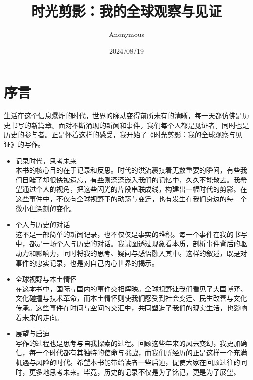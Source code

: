 \documentclass[lang=cn,newtx,10pt,scheme=chinese]{elegantbook}
\title{时光剪影：我的全球观察与见证}
\author{Anonymous}
\date{2024/08/19}
\begin{document}
\maketitle
\frontmatter

\tableofcontents

\mainmatter

\chapter{序言}

生活在这个信息爆炸的时代，世界的脉动变得前所未有的清晰，每一天都仿佛是历史书写的新篇章。面对不断涌现的新闻和事件，我们每个人都是见证者，同时也是历史的参与者。正是怀着这样的感受，我开始了《时光剪影：我的全球观察与见证》的写作。

\begin{itemize}
\item 记录时代，思考未来 \\
本书的核心目的在于记录和反思。时代的洪流裹挟着无数重要的瞬间，有些我们目睹了却很快被遗忘，有些则深深嵌入我们的记忆中，久久不能散去。我希望通过个人的视角，把这些闪光的片段串联成线，构建出一幅时代的剪影。在这些事件中，不仅有全球视野下的动荡与变迁，也有发生在我们身边的每一个微小但深刻的变化。

\item 个人与历史的对话 \\
这不是一部简单的新闻记录，也不仅仅是事实的堆积。每一个事件在我的书写中，都是一场个人与历史的对话。我试图透过现象看本质，剖析事件背后的驱动力和影响力，同时将我的思考、疑问与感悟融入其中。这样的叙述，既是对事件的忠实记录，也是对自己内心世界的揭示。

\item 全球视野与本土情怀 \\
在这本书中，国际与国内的事件交相辉映。全球视野让我们看见了大国博弈、文化碰撞与技术革命，而本土情怀则使我们感受到社会变迁、民生改善与文化传承。这些事件在时间与空间的交汇中，共同塑造了我们的现实生活，也影响着未来的走向。

\item 展望与启迪 \\
写作的过程也是思考与自我探索的过程。回顾这些年来的风云变幻，我更加确信，每一个时代都有其独特的使命与挑战，而我们所经历的正是这样一个充满机遇与风险的时代。希望本书能带给读者一些启迪，促使大家在回顾过往的同时，更多地思考未来。毕竟，历史的记录不仅是为了铭记，更是为了展望。
\end{itemize}



\end{document}
